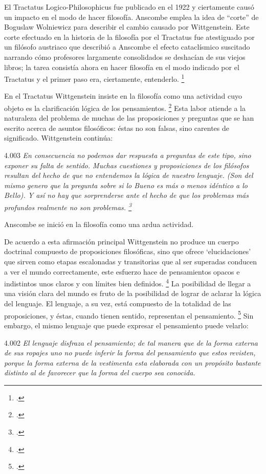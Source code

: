 \documentclass[../main.tex]{subfiles}
\begin{document}
El Tractatus Logico-Philosophicus fue publicado en el 1922 y ciertamente causó un impacto en el modo de hacer filosofía. Anscombe emplea la idea de ``corte'' de Boguslaw Wolniewicz para describir el cambio causado por Wittgenstein. Este corte efectuado en la historia de la filosofía por el Tractatus fue atestiguado por un filósofo austriaco que describió a Anscombe el efecto cataclísmico suscitado narrando cómo profesores largamente consolidados se deshacían de sus viejos libros; la tarea consistía ahora en hacer filosofía en el modo indicado por el Tractatus y el primer paso era, ciertamente, entenderlo. \footcite[p.181]{twocuts} 

En el Tractatus Wittgenstein insiste en la filosofía como una actividad cuyo objeto es la clarificación lógica de los pensamientos. \footcite[4.112 p. 52]{tractatus} Esta labor atiende a la naturaleza del problema de muchas de las proposiciones y preguntas que se han escrito acerca de asuntos filosóficos: éstas no son falsas, sino carentes de significado. Wittgenstein continúa:

4.003 \emph{En consecuencia no podemos dar respuesta a preguntas de este tipo, sino exponer su falta de sentido. Muchas cuestiones y proposiciones de los filósofos resultan del hecho de que no entendemos la lógica de nuestro lenguaje. (Son del mismo genero que la pregunta sobre si lo Bueno es más o menos idéntico a lo Bello). Y así no hay que sorprenderse ante el hecho de que los problemas más profundos realmente no son problemas. \footcite[4.003 p. 45]{tractatus}}

Anscombe se inició en la filosofía como una ardua actividad.

De acuerdo a esta afirmación principal Wittgenstein no produce un cuerpo doctrinal compuesto de proposiciones filosóficas, sino que ofrece `elucidaciones' que sirven como etapas escalonadas y transitorias que al ser superadas conducen a ver el mundo correctamente, este esfuerzo hace de pensamientos opacos e indistintos unos claros y con límites bien definidos. \footcite[cf. 4.112 y 6.54]{tractatus} La posibilidad de llegar a una visión clara del mundo es fruto de la posibilidad de lograr de aclarar la lógica del lenguaje. El lenguaje, a su vez, está compuesto de la totalidad de las proposiciones, y éstas, cuando tienen sentido, representan el pensamiento. \footcite[cf. 4 y 4.001]{tractatus} Sin embargo, el mismo lenguaje que puede expresar el pensamiento puede velarlo:

4.002 \emph{El lenguaje disfraza el pensamiento; de tal manera que de la forma externa de sus ropajes uno no puede inferir la forma del pensamiento que estos revisten, porque la forma externa de la vestimenta esta elaborada con un propósito bastante distinto al de favorecer que la forma del cuerpo sea conocida.}
\end{document}
